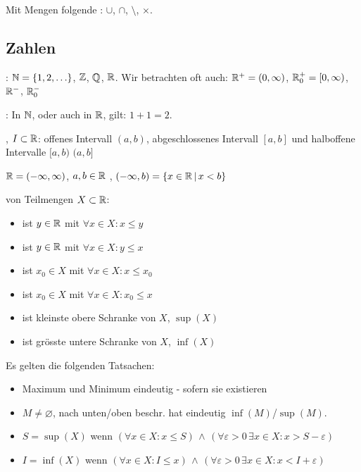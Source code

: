 \Def Mit Mengen folgende :
$\cup$, $\cap$, $\setminus$, $\times$.

\subsection{Zahlen}

\Def {}: $\mathbb{N} = \{1, 2, \ldots\}$, $\mathbb{Z}$, $\mathbb{Q}$, $\mathbb{R}$.
Wir betrachten oft auch: $\mathbb{R}^+ = (0, \infty)$, $\mathbb{R}^+_0 = [0, \infty)$, $\mathbb{R}^-$, $\mathbb{R}^-_0$

\Satz {}: In $\mathbb{N}$, oder auch in $\mathbb{R}$, gilt: $1 + 1 = 2$.

\Def {}, $I \subset \mathbb{R}$:
offenes Intervall $(a, b)$, abgeschlossenes Intervall $[a, b]$ und halboffene Intervalle $[a, b)$ $(a, b]$

$\mathbb{R} = (-\infty, \infty)$, $a, b \in \mathbb{R}$ ,
$(-\infty, b) = \{x \in \mathbb{R} \, | \, x < b\}$

\Def {} von Teilmengen $X \subset \mathbb{R}$:
\vspace{-0.6em}
\begin{itemize}
    \item {} ist $y \in \mathbb{R}$ mit $\forall x \in X : x\le y$
    \item {} ist $y \in \mathbb{R}$ mit $\forall x \in X : y\le x$
    \item {} ist $x_0 \in X$ mit $\forall x \in X : x\le x_0$
    \item {} ist $x_0 \in X$ mit $\forall x \in X : x_0\le x$
    \item {} ist kleinste obere Schranke von $X$, $\sup(X)$
    \item {} ist grösste untere Schranke von $X$, $\inf(X)$
\end{itemize}

\Satz
Es gelten die folgenden Tatsachen:
\vspace{-0.6em}
\begin{itemize}
    \item Maximum und Minimum eindeutig - sofern sie existieren
    \item $M\ne \varnothing$, nach unten/oben beschr. hat eindeutig $\inf(M)$/$\sup(M)$.
    \item $S = \sup(X)$ wenn $(\forall x \in X : x\le S) \, \land \, (\forall \varepsilon > 0 \, \exists x \in X : x > S - \varepsilon)$
    \item $I = \inf(X)$ wenn $(\forall x \in X : I\le x) \, \land \, (\forall \varepsilon > 0 \, \exists x \in X : x < I + \varepsilon)$
\end{itemize}

